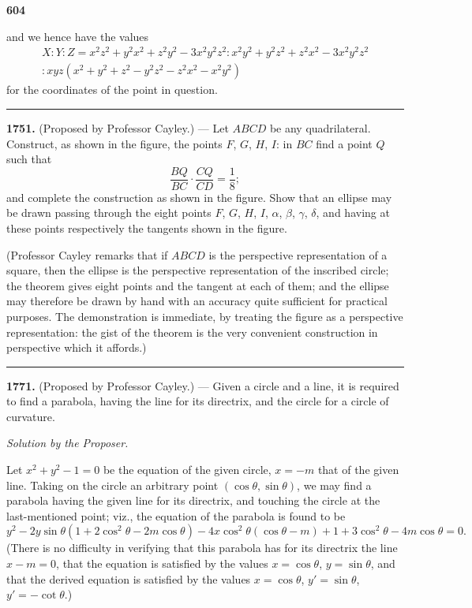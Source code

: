 \documentclass[12pt,a4paper]{article}
\theoremstyle{plain}
\begin{document}
\newpage
\noindent\textbf{604}

and we hence have the values
\begin{multline*}
X:Y:Z = x^2z^2+y^2x^2+z^2y^2-3x^2y^2z^2 : x^2y^2+y^2z^2+z^2x^2-3x^2y^2z^2 \\
: xyz(x^2+y^2+z^2-y^2z^2-z^2x^2-x^2y^2)
\end{multline*}
for the coordinates of the point in question.

\vspace{0.5cm}
\noindent\rule{\textwidth}{0.4pt}
\vspace{0.3cm}

\noindent[Vol.~IV. pp.~38, 39.]

\vspace{0.3cm}
\noindent\textbf{1751.} (Proposed by Professor Cayley.) --- Let $ABCD$ be any quadrilateral. Construct, as shown in the figure, the points $F$, $G$, $H$, $I$: in $BC$ find a point $Q$ such that
\[\frac{BQ}{BC} \cdot \frac{CQ}{CD} = \frac{1}{8};\]
and complete the construction as shown in the figure. Show that an ellipse may be drawn passing through the eight points $F$, $G$, $H$, $I$, $\alpha$, $\beta$, $\gamma$, $\delta$, and having at these points respectively the tangents shown in the figure.

(Professor Cayley remarks that if $ABCD$ is the perspective representation of a square, then the ellipse is the perspective representation of the inscribed circle; the theorem gives eight points and the tangent at each of them; and the ellipse may therefore be drawn by hand with an accuracy quite sufficient for practical purposes. The demonstration is immediate, by treating the figure as a perspective representation: the gist of the theorem is the very convenient construction in perspective which it affords.)

\vspace{0.3cm}
\noindent\rule{\textwidth}{0.4pt}
\vspace{0.3cm}

\noindent[Vol.~IV. pp.~70, 71.]

\vspace{0.3cm}
\noindent\textbf{1771.} (Proposed by Professor Cayley.) --- Given a circle and a line, it is required to find a parabola, having the line for its directrix, and the circle for a circle of curvature.

\textit{Solution by the Proposer.}

Let $x^2+y^2-1=0$ be the equation of the given circle, $x=-m$ that of the given line. Taking on the circle an arbitrary point $(\cos\theta,\sin\theta)$, we may find a parabola having the given line for its directrix, and touching the circle at the last-mentioned point; viz., the equation of the parabola is found to be
\[y^2 - 2y\sin\theta(1+2\cos^2\theta-2m\cos\theta) - 4x\cos^2\theta(\cos\theta-m) + 1 + 3\cos^2\theta - 4m\cos\theta = 0.\]
(There is no difficulty in verifying that this parabola has for its directrix the line $x-m=0$, that the equation is satisfied by the values $x=\cos\theta$, $y=\sin\theta$, and that the derived equation is satisfied by the values $x=\cos\theta$, $y'=\sin\theta$, $y'=-\cot\theta$.)
\end{document}
